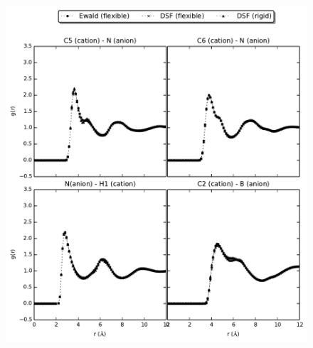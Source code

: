 \documentclass[3p,onecolumn]{elsarticle}
\begin{document}
\begin{figure}[ht]
\includegraphics[]{rdf-Weber}
\caption{\ce{[emim][B(CN)_4]}}
\label{fig:rdf-Weber}
\end{figure}
\end{document}
